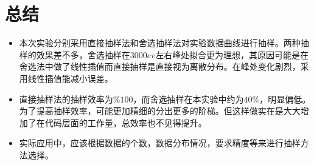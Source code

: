 \documentclass[UTF8]{ctexart}
\begin{document}

	\section{总结}
	\begin{itemize}
		\item 本次实验分别采用直接抽样法和舍选抽样法对实验数据曲线进行抽样。两种抽样的效果差不多，舍选抽样在$3000ev$左右峰处拟合更为理想，其原因可能是在舍选法中做了线性插值而直接抽样是直接视为离散分布。在峰处变化剧烈，采用线性插值能减小误差。
		\item 直接抽样法的抽样效率为$\%100$，而舍选抽样在本实验中约为$40\%$，明显偏低。为了提高抽样效率，可能更加精细的分出更多的阶梯。但这样做实在是大大增加了在代码层面的工作量，总效率也不见得提升。
		\item 实际应用中，应该根据数据的个数，数据分布情况，要求精度等来进行抽样方法选择。
	\end{itemize}
	\clearpage
\end{document}
